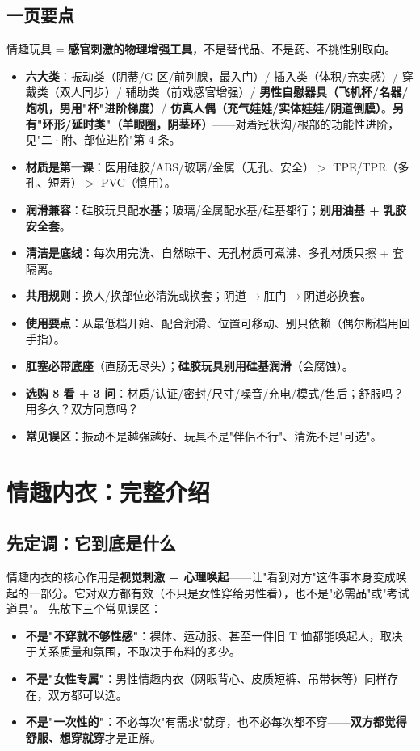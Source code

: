 \documentclass[12pt,UTF8,openany]{ctexbook}
\begin{document}
\subsection*{一页要点}
情趣玩具 = \textbf{感官刺激的物理增强工具}，不是替代品、不是药、不挑性别取向。
\begin{itemize}[leftmargin=2em,itemsep=0.2em]
  \item \textbf{六大类}：振动类（阴蒂/G 区/前列腺，最入门）/ 插入类（体积/充实感）/ 穿戴类（双人同步）/ 辅助类（前戏感官增强）/ \textbf{男性自慰器具（飞机杯/名器/炮机，男用"杯"进阶梯度）}/ \textbf{仿真人偶（充气娃娃/实体娃娃/阴道倒膜）}。\textbf{另有"环形/延时类"（羊眼圈，阴茎环）}——对着冠状沟/根部的功能性进阶，见"二·附、部位进阶"第 4 条。
  \item \textbf{材质是第一课}：医用硅胶/ABS/玻璃/金属（无孔、安全）$>$ TPE/TPR（多孔、短寿）$>$ PVC（慎用）。
  \item \textbf{润滑兼容}：硅胶玩具配\textbf{水基}；玻璃/金属配水基/硅基都行；\textbf{别用油基 + 乳胶安全套}。
  \item \textbf{清洁是底线}：每次用完洗、自然晾干、无孔材质可煮沸、多孔材质只擦 + 套隔离。
  \item \textbf{共用规则}：换人/换部位必清洗或换套；阴道$\to$肛门$\to$阴道必换套。
  \item \textbf{使用要点}：从最低档开始、配合润滑、位置可移动、别只依赖（偶尔断档用回手指）。
  \item \textbf{肛塞必带底座}（直肠无尽头）；\textbf{硅胶玩具别用硅基润滑}（会腐蚀）。
  \item \textbf{选购 8 看 + 3 问}：材质/认证/密封/尺寸/噪音/充电/模式/售后；舒服吗？用多久？双方同意吗？
  \item \textbf{常见误区}：振动不是越强越好、玩具不是"伴侣不行"、清洗不是"可选"。
\end{itemize}

\section{情趣内衣：完整介绍}

\subsection*{先定调：它到底是什么}
情趣内衣的核心作用是\textbf{视觉刺激 + 心理唤起}——让"看到对方"这件事本身变成唤起的一部分。它对双方都有效（不只是女性穿给男性看），也不是"必需品"或"考试道具"。
先放下三个常见误区：
\begin{itemize}[leftmargin=2em,itemsep=0.3em]
  \item \textbf{不是"不穿就不够性感"}：裸体、运动服、甚至一件旧 T 恤都能唤起人，取决于关系质量和氛围，不取决于布料的多少。
  \item \textbf{不是"女性专属"}：男性情趣内衣（网眼背心、皮质短裤、吊带袜等）同样存在，双方都可以选。
  \item \textbf{不是"一次性的"}：不必每次"有需求"就穿，也不必每次都不穿——\textbf{双方都觉得舒服、想穿就穿}才是正解。
\end{itemize}
\end{document}
